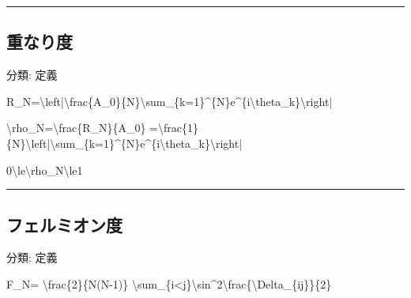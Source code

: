 \documentclass[
  a4paper,
]{ltjsarticle}
\newenvironment{Shaded}{}{}
\newcommand{\NormalTok}[1]{#1}
\begin{document}
\begin{center}\rule{0.5\linewidth}{0.5pt}\end{center}

\subsection{重なり度}\label{ux91cdux306aux308aux5ea6}

分類: 定義

\begin{Shaded}
\begin{Highlighting}[]
\NormalTok{R\_N=\textbackslash{}left|\textbackslash{}frac\{A\_0\}\{N\}\textbackslash{}sum\_\{k=1\}\^{}\{N\}e\^{}\{i\textbackslash{}theta\_k\}\textbackslash{}right|}
\end{Highlighting}
\end{Shaded}

\begin{Shaded}
\begin{Highlighting}[]
\NormalTok{\textbackslash{}rho\_N=\textbackslash{}frac\{R\_N\}\{A\_0\}}
\NormalTok{=\textbackslash{}frac\{1\}\{N\}\textbackslash{}left|\textbackslash{}sum\_\{k=1\}\^{}\{N\}e\^{}\{i\textbackslash{}theta\_k\}\textbackslash{}right|}
\end{Highlighting}
\end{Shaded}

\begin{Shaded}
\begin{Highlighting}[]
\NormalTok{0\textbackslash{}le\textbackslash{}rho\_N\textbackslash{}le1}
\end{Highlighting}
\end{Shaded}

\begin{center}\rule{0.5\linewidth}{0.5pt}\end{center}

\subsection{フェルミオン度}\label{ux30d5ux30a7ux30ebux30dfux30aaux30f3ux5ea6}

分類: 定義

\begin{Shaded}
\begin{Highlighting}[]
\NormalTok{F\_N=}
\NormalTok{\textbackslash{}frac\{2\}\{N(N{-}1)\}}
\NormalTok{\textbackslash{}sum\_\{i\textless{}j\}\textbackslash{}sin\^{}2\textbackslash{}frac\{\textbackslash{}Delta\_\{ij\}\}\{2\}}
\end{Highlighting}
\end{Shaded}
\end{document}
